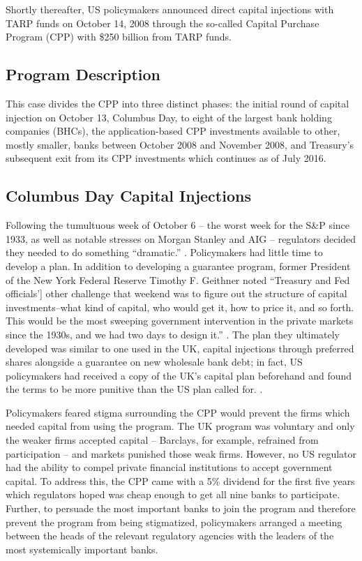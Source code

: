 \documentclass[12pt]{article}
\begin{document}
Shortly thereafter, US policymakers announced direct capital injections with TARP funds on October 14, 2008 through the so-called Capital Purchase Program (CPP) with \$250 billion from TARP funds.

\subsection{Program Description}

This case divides the CPP into three distinct phases: the initial round of capital injection on October 13, Columbus Day, to eight of the largest bank holding companies (BHCs), the application-based CPP investments available to other, mostly smaller, banks between October 2008 and November 2008, and Treasury's subsequent exit from its CPP investments which continues as of July 2016.

\subsection*{Columbus Day Capital Injections}

Following the tumultuous week of October 6 -- the worst week for the S\&P since 1933, as well as notable stresses on Morgan Stanley and AIG -- regulators decided they needed to do something ``dramatic.'' \citep{paulsonbook}. Policymakers had little time to develop a plan. In addition to developing a guarantee program, former President of the New York Federal Reserve Timothy F. Geithner noted ``Treasury and Fed officials'] other challenge that weekend was to figure out the structure of capital investments--what kind of capital, who would get it, how to price it, and so forth. This would be the most sweeping government intervention in the private markets since the 1930s, and we had two days to design it.'' \citep{Geithner}. The plan they ultimately developed was similar to one used in the UK, capital injections through preferred shares alongside a guarantee on new wholesale bank debt; in fact, US policymakers had received a copy of the UK's capital plan beforehand and found the terms to be more punitive than the US plan called for. \citep{paulsonbook}.

Policymakers feared stigma surrounding the CPP would prevent the firms which needed capital from using the program. The UK program was voluntary and only the weaker firms accepted capital -- Barclays, for example, refrained from participation -- and markets punished those weak firms. However, no US regulator had the ability to compel private financial institutions to accept government capital. To address this, the CPP came with a 5\% dividend for the first five years which regulators hoped was cheap enough to get all nine banks to participate. Further, to persuade the most important banks to join the program and therefore prevent the program from being stigmatized, policymakers arranged a meeting between the heads of the relevant regulatory agencies with the leaders of the most systemically important banks.
\end{document}
